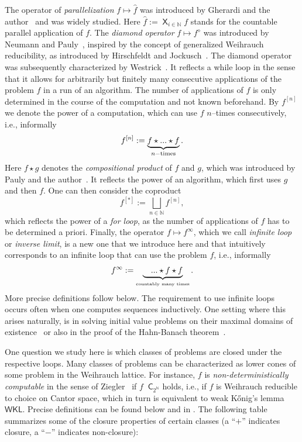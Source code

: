 \documentclass[11pt,a4paper]{amsart}
\theoremstyle{plain}
\theoremstyle{definition}
\theoremstyle{defC}
\theoremstyle{thmC}
\theoremstyle{plain}
\numberwithin{equation}{section}
\def\IN{{\mathbb{N}}}
\def\C{{\mathsf{{C}}}}
\def\WKL{\mathsf{WKL}}
\def\C{\mathsf{C}}
\def\leqW{\mathop{\leq_{\mathrm{W}}}}
\def\bigtimes{\mathop{\mathsf{X}}}
\def\leqW{\mathop{\leq_{\mathrm{W}}}}
\begin{document}
\noindent
The operator of {\em parallelization} $f\mapsto\widehat{f}$ was introduced by Gherardi and the author~\cite{BG11} and was widely studied.
Here $\widehat{f}:=\bigtimes_{i\in\IN}f$ stands for the countable parallel application of $f$.
The {\em diamond operator} $f\mapsto f^\diamond$ was introduced by Neumann and Pauly~\cite{NP18}, inspired by the concept of generalized Weihrauch
reducibility, as introduced by Hirschfeldt and Jockusch~\cite{HJ16}.
The diamond operator was subsequently characterized by Westrick~\cite{Wes21}. It reflects a while loop in the sense that it allows for
arbitrarily but finitely many consecutive applications of the problem $f$ in a run of an algorithm.
The number of applications of $f$ is only determined in the course of the computation and not known beforehand.
By $f^{[n]}$ we denote the power of a computation, which can use $f$ $n$--times consecutively, i.e., informally
\[f^{[n]}:=\underbrace{f\star ...\star f}_{n\rm-times}.\]
Here $f\star g$ denotes the {\em compositional product} of $f$ and $g$, which was introduced by  Pauly and the author~\cite{BP18}.
It reflects the power of an algorithm, which first uses $g$ and then $f$.
One can then consider the coproduct 
\[f^{[*]}:=\bigsqcup_{n\in\IN}f^{[n]},\] 
which reflects the power of a {\em for loop}, as the number of applications of $f$
has to be determined a priori.
Finally, the operator $f\mapsto f^\infty$, which we call {\em infinite loop} or {\em inverse limit}, is a new one that we introduce here and 
that intuitively corresponds to an infinite loop that can use the problem $f$, i.e., informally
\[f^\infty:=\underbrace{\quad...\star f \star f}_{\mbox{\tiny countably many times}}.\]
More precise definitions follow below.
The requirement to use infinite loops occurs often when one computes sequences inductively. 
One setting where this arises naturally, is in solving initial value problems on their maximal domains of existence~\cite{BS25} or also in the proof of the Hahn-Banach theorem~\cite{BS26}.

One question we study here is which classes of problems are closed under the respective loops.
Many classes of problems can be characterized as lower cones of some problem in the Weihrauch lattice.
For instance, $f$ is {\em non-deterministically computable} in the sense of Ziegler~\cite{Zie07} if $f\leqW\C_{2^\IN}$ holds, i.e.,
if $f$ is Weihrauch reducible to choice on Cantor space, which in turn is equivalent to weak K\H{o}nig's lemma $\WKL$.
Precise definitions can be found below and in \cite{BGP21}.
The following table summarizes some of the closure properties of certain classes (a ``$+$'' indicates closure, a ``$-$'' indicates non-closure):
\end{document}
